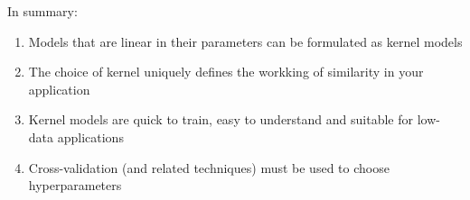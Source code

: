 In summary:
\vspace{1cm}
\pause{}
\begin{enumerate}
	\item Models that are linear in their parameters can be formulated as kernel models\pause{}
	\item The choice of kernel uniquely defines the workking of similarity in your application\pause{}
	\item Kernel models are quick to train, easy to understand and suitable for low-data applications\pause{}
	\item Cross-validation (and related techniques)  must be used to choose hyperparameters\pause{}
\end{enumerate}
